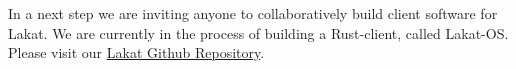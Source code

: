In a next step we are inviting anyone to collaboratively build client software for Lakat. We are currently in the process of building a Rust-client, called Lakat-OS. Please visit our \href{https://github.com/Lakat-OS}{Lakat Github Repository}.

